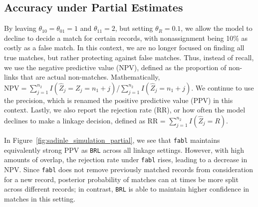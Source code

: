 \documentclass[ba]{imsart}
\begin{document}
\hypertarget{partial}{%
	\subsection{Accuracy under Partial Estimates}\label{partial}}

By leaving $\theta_{10} = \theta_{01} = 1$ and $\theta_{11} = 2$, but setting $\theta_R = 0.1$, we allow the model to decline to decide a match for certain records, with nonassignment being 10\% as costly as a false match. In this context, we are no longer focused on finding all true matches, but rather protecting against false matches. Thus, instead of recall, we use the negative predictive value (NPV), defined as the proportion of non-links that are actual non-matches. Mathematically, $\text{NPV} = \sum_{j=1}^{n_2} I(\hat{Z}_j = Z_j = n_1 + j)$/$\sum_{j=1}^{n_2} I(\hat{Z}_j = n_1 + j)$. We continue to use the precision, which is renamed the positive predictive value (PPV) in this context. Lastly, we also report the rejection rate (RR), or how often the model declines to make a linkage decision, defined as RR = $\sum_{j=1}^{n_2} I(\hat{Z}_j = R)$.

In Figure~\ref{fig:sadinle_simulation_partial}, we see that \texttt{fabl} maintains equivalently strong PPV as \texttt{BRL} across all linkage settings. However, with high amounts of overlap, the rejection rate under \texttt{fabl} rises, leading to a decrease in NPV. Since \texttt{fabl} does not remove previously matched records from consideration for a new record, posterior probability of matches can at times be more split across different records; in contrast, \texttt{BRL} is able to maintain higher confidence in matches in this setting. 


\end{document}
